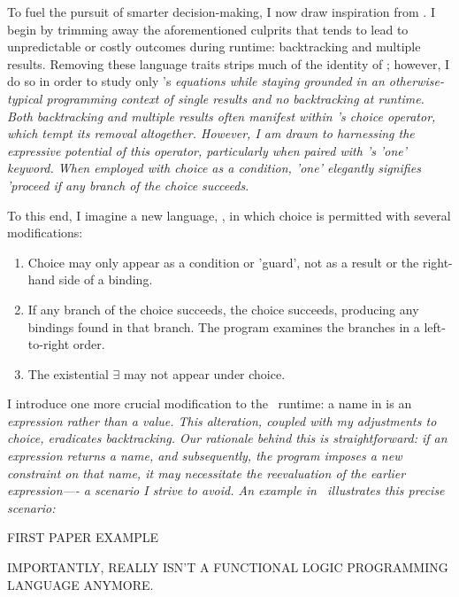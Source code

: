 \documentclass[manuscript,screen,review, 12pt, nonacm]{acmart}
\begin{document}
        To fuel the pursuit of smarter decision-making, I now draw inspiration
        from \VC. I begin by trimming away the aforementioned culprits that
        tends to lead to unpredictable or costly outcomes during runtime:
        backtracking and multiple results. Removing these language traits strips
        much of the identity of \VC; however, I do so in order to study only
        \VC's \it{equations} while staying grounded in an otherwise-typical
        programming context of single results and no backtracking at runtime.
        Both backtracking and multiple results often manifest within \VC's
        choice operator, which tempt its removal altogether. However, I am drawn
        to harnessing the expressive potential of this operator, particularly
        when paired with \VC's 'one' keyword. When employed with choice as a
        condition, 'one' elegantly signifies 'proceed if any branch of the
        choice succeeds. 
        
        To this end, I imagine a new language, \VMinus, in which choice is
        permitted with several modifications:

        \begin{enumerate}
        \item Choice may only appear as a condition or 'guard', not as a result
        or the right-hand side of a binding.
        \item If any branch of the choice succeeds, the choice succeeds,
        producing any bindings found in that branch. The program examines the
        branches in a left-to-right order.
        \item The existential $\exists$ may not appear under choice.
        \end{enumerate}

        I introduce one more crucial modification to the \VC\ runtime: a name in
        \VMinus is an \it{expression} rather than a \it{value}. This alteration,
        coupled with my adjustments to choice, eradicates backtracking. Our
        rationale behind this is straightforward: if an expression returns a
        name, and subsequently, the program imposes a new constraint on that
        name, it may necessitate the reevaluation of the earlier expression—- a
        scenario I strive to avoid. An example in \VC\ illustrates this precise
        scenario:

        FIRST PAPER EXAMPLE 

        IMPORTANTLY, \VMinus REALLY ISN'T A FUNCTIONAL LOGIC PROGRAMMING LANGUAGE ANYMORE. 
        
\end{document}

